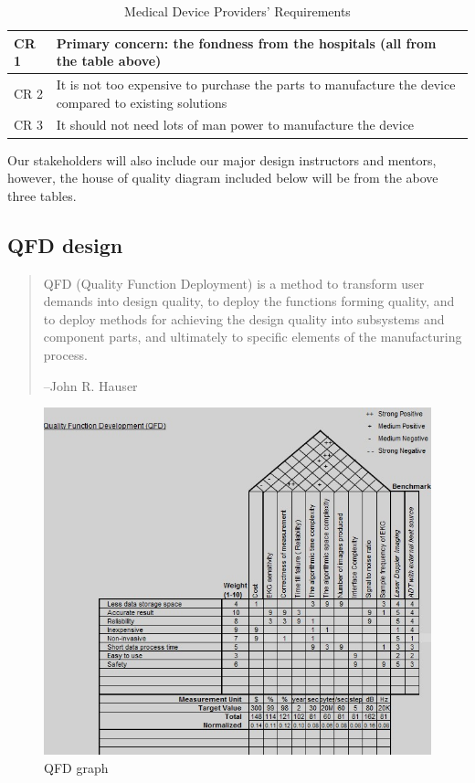 \documentclass[paper=letter, fontsize=11pt]{scrartcl}
\numberwithin{equation}{section}		%
\numberwithin{figure}{section}			%
\numberwithin{table}{section}			%
\begin{document}
\begin {table}[H]
\centering
\begin{tabular}{l|p{12cm}}
CR 1 & Primary concern: the fondness from the hospitals (all from the table above) \\ \hline
CR 2 & It is not too expensive to purchase the parts to manufacture the device compared to existing solutions\\ \hline
CR 3 & It should not need lots of man power to manufacture the device \\ \hline
\end{tabular}
\caption{Medical Device Providers' Requirements}
\label{Medical Devices CR}
\end {table}

Our stakeholders will also include our major design instructors and mentors, however, the house of quality diagram included below will be from the above three tables.

\subsection{QFD design}
\begin{quotation}
QFD (Quality Function Deployment) is a method to transform user demands into design quality, to deploy the functions forming quality, and to deploy methods for achieving the design quality into subsystems and component parts, and ultimately to specific elements of the manufacturing process.

\hfill --John R. Hauser
\end{quotation}

\begin{figure}[H]
    \centering
	\includegraphics[scale=1]{qfd.png}
	\caption{QFD graph}
\end{figure}
\end{document}
